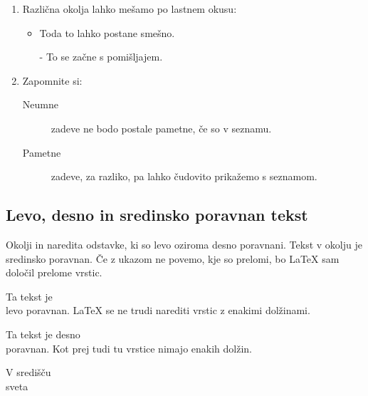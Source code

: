 \begin{example}
\flushleft
\begin{enumerate}
\item Različna okolja lahko mešamo 
po lastnem okusu:
\begin{itemize}
\item Toda to lahko postane smešno. 
\item[-] To se začne s pomišljajem.
\end{itemize}
\item Zapomnite si:
\begin{description}
\item[Neumne] zadeve ne bodo 
postale pametne, če so v 
seznamu.
\item[Pametne] zadeve, za razliko,
pa lahko čudovito prikažemo 
s seznamom.
\end{description}
\end{enumerate}
\end{example}

 
\subsection{Levo, desno in sredinsko poravnan tekst}

Okolji  in  naredita odstavke, ki so 
levo oziroma desno poravnani.
Tekst v okolju  je sredinsko poravnan. Če z ukazom 
\ci{\bs} ne povemo, kje so prelomi, bo \LaTeX{} sam določil prelome vrstic.

\begin{example}
\begin{flushleft}
Ta tekst je \\ levo poravnan. 
\LaTeX{} se ne trudi narediti 
vrstic z enakimi dolžinami.
\end{flushleft}
\end{example}

\begin{example}
\begin{flushright}
Ta tekst je desno \\poravnan.
Kot prej tudi tu vrstice nimajo
enakih dolžin.
\end{flushright}
\end{example}

\begin{example}
\begin{center}
V središču\\sveta
\end{center}
\end{example}

